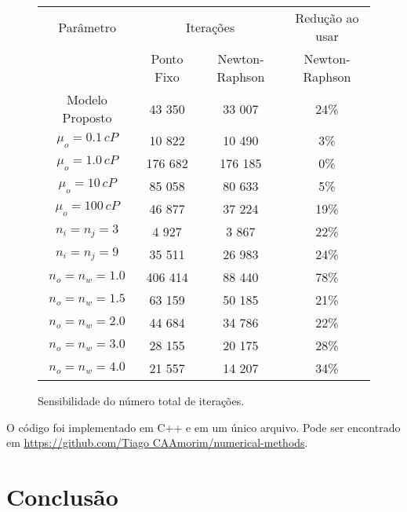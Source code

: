 \documentclass[final,5p]{elsarticle}
\numberwithin{equation}{section}
\begin{document}
        \begin{figure*}
            \caption{Sensibilidade do número total de iterações.}
            \label{tab:sens}
            \begin{center}
                \renewcommand{\arraystretch}{1.2}
                \begin{tabular}{c|cc|c}
                    Parâmetro & \multicolumn{2}{c|}{Iterações}  & Redução ao usar \\
                            & Ponto Fixo      & Newton-Raphson & Newton-Raphson \\
                    \hline
                    Modelo Proposto & 43 350 & 33 007 & 24\% \\
                    \hline
                    $\mu_o = 0.1\,cP$ & 10 822 & 10 490 & 3\% \\
                    $\mu_o = 1.0\,cP$ & 176 682 & 176 185  & 0\% \\
                    $\mu_o = 10\,cP$ & 85 058 & 80 633 & 5\% \\
                    $\mu_o = 100\,cP$ & 46 877 & 37 224 & 19\% \\
                    \hline
                    $n_i = n_j = 3$ & 4 927 & 3 867 & 22\% \\
                    $n_i = n_j = 9$ & 35 511 & 26 983 & 24\% \\
                    \hline
                    $n_o = n_w = 1.0$ & 406 414 & 88 440 & 78\% \\
                    $n_o = n_w = 1.5$ & 63 159 & 50 185 & 21\% \\
                    $n_o = n_w = 2.0$ & 44 684 & 34 786 & 22\% \\
                    $n_o = n_w = 3.0$ & 28 155 & 20 175 & 28\%  \\
                    $n_o = n_w = 4.0$ & 21 557 & 14 207 & 34\%  \\
                \end{tabular}
            \end{center}
        \end{figure*}

        O código foi implementado em C++ e em um único arquivo. Pode ser encontrado em \href{https://github.com/TiagoCAAmorim/numerical-methods/blob/main/12_NewtonRaphson/12_NewtonRaphson.cpp}{https://github.com/Tiago CAAmorim/numerical-methods}.

\section{Conclusão}
\end{document}
